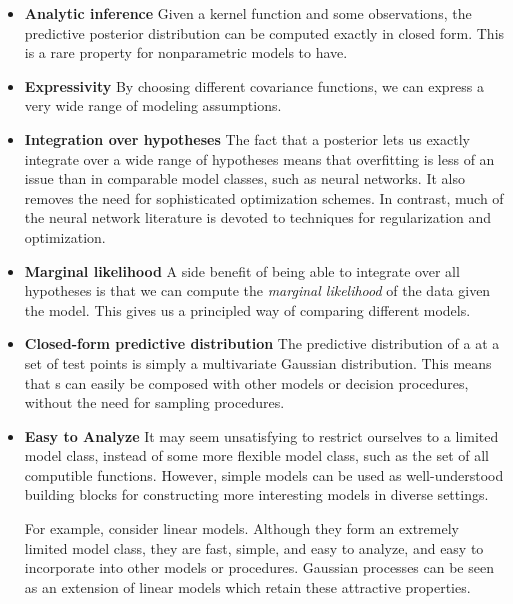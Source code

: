 \begin{itemize}

\item {\bf Analytic inference}
Given a kernel function and some observations, the predictive posterior distribution can be computed exactly in closed form.  This is a rare property for nonparametric models to have.

\item {\bf Expressivity}
By choosing different covariance functions, we can express a very wide range of modeling assumptions.

\item {\bf Integration over hypotheses}
The fact that a \gp{} posterior lets us exactly integrate over a wide range of hypotheses means that overfitting is less of an issue than in comparable model classes, such as neural networks.
It also removes the need for sophisticated optimization schemes.
%
In contrast, much of the neural network literature is devoted to techniques for regularization and optimization.

\item {\bf Marginal likelihood}
A side benefit of being able to integrate over all hypotheses is that we can compute the \emph{marginal likelihood} of the data given the model.
This gives us a principled way of comparing different models.

\item {\bf Closed-form predictive distribution}
The predictive distribution of a \gp{} at a set of test points is simply a multivariate Gaussian distribution.
This means that \gp{}s can easily be composed with other models or decision procedures, without the need for sampling procedures.

\item {\bf Easy to Analyze}
It may seem unsatisfying to restrict ourselves to a limited model class, instead of some more flexible model class, such as the set of all computible functions.
However, simple models can be used as well-understood building blocks for constructing more interesting models in diverse settings.

For example, consider linear models.
Although they form an extremely limited model class, they are fast, simple, and easy to analyze, and easy to incorporate into other models or procedures.
Gaussian processes can be seen as an extension of linear models which retain these attractive properties.

\end{itemize}




